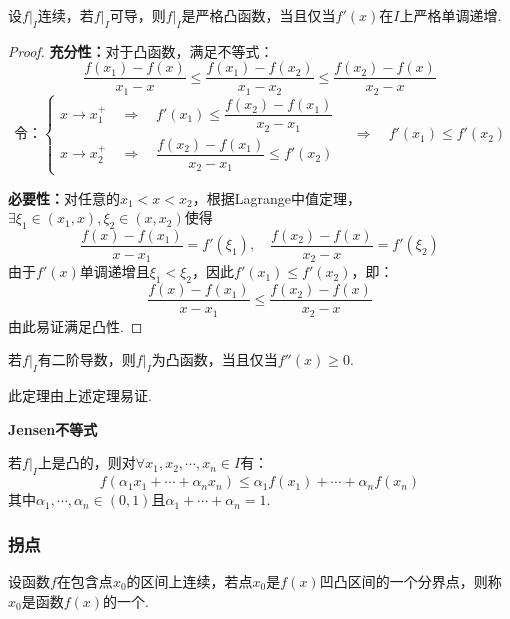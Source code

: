\begin{theorem}
    设$\left.f\right|_{I}$连续，若$\left.f\right|_{I}$可导，则$\left.f\right|_{I}$是严格凸函数，当且仅当$f'(x)$在$I$上严格单调递增.
\end{theorem}

\begin{proof}
    \textbf{充分性：}对于凸函数，满足不等式：
    \[\frac{f(x_1)-f(x)}{x_1-x} \leqslant \frac{f(x_1)-f(x_2)}{x_1-x_2} \leqslant \frac{f(x_2)-f(x)}{x_2-x}\]
    \[\text{令：}\begin{cases}
        x\to x_1^+ \quad\Rightarrow\quad f'(x_1) \leqslant \dfrac{f(x_2)-f(x_1)}{x_2-x_1} \\
        x\to x_2^+ \quad\Rightarrow\quad \dfrac{f(x_2)-f(x_1)}{x_2-x_1} \leqslant f'(x_2)
    \end{cases} \quad\Rightarrow\quad f'(x_1)\leqslant f'(x_2)\]

    \textbf{必要性：}对任意的$x_1<x<x_2$，根据Lagrange中值定理，$\exists \xi_1 \in (x_1,x), \xi_2 \in (x,x_2)$使得
    \[\frac{f(x)-f(x_1)}{x-x_1} = f'(\xi_1),\quad\frac{f(x_2)-f(x)}{x_2-x} = f'(\xi_2)\]
    由于$f'(x)$单调递增且$\xi_1 < \xi_2$，因此$f'(x_1) \leqslant f'(x_2)$，即：
    \[\frac{f(x)-f(x_1)}{x-x_1} \leqslant \frac{f(x_2)-f(x)}{x_2-x}\]
    由此易证满足凸性.
\end{proof}

\begin{theorem}
    若$\left.f\right|_{I}$有二阶导数，则$\left.f\right|_{I}$为凸函数，当且仅当$f''(x)\geqslant 0$.
\end{theorem}

此定理由上述定理易证.

\begin{theorem}
    \textbf{Jensen不等式}

    若$\left.f\right|_{I}$上是凸的，则对$\forall x_1,x_2,\cdots,x_n \in I$有：
    \[f(\alpha_1 x_1 + \cdots + \alpha_n x_n) \leqslant \alpha_1 f(x_1) + \cdots + \alpha_n f(x_n)\]
    其中$\alpha_1, \cdots, \alpha_n \in (0,1)$且$\alpha_1 + \cdots + \alpha_n = 1$.
\end{theorem}


\subsubsection{拐点}
\begin{definition}
    设函数$f$在包含点$x_0$的区间上连续，若点$x_0$是$f(x)$凹凸区间的一个分界点，则称$x_0$是函数$f(x)$的一个.
\end{definition}

